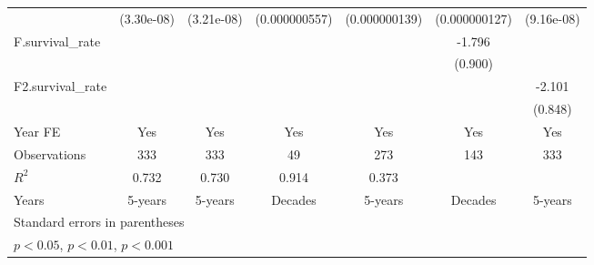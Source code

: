 \begin{table}[htbp]
\begin{tabular}{l*{6}{c}}
                &(3.30e-08)         &(3.21e-08)         &(0.000000557)         &(0.000000139)         &(0.000000127)         &(9.16e-08)         \\
\addlinespace
F.survival\_rate &                  &                  &                  &                  &   -1.796\sym{*}  &                  \\
                &                  &                  &                  &                  &  (0.900)         &                  \\
\addlinespace
F2.survival\_rate&                  &                  &                  &                  &                  &   -2.101\sym{*}  \\
                &                  &                  &                  &                  &                  &  (0.848)         \\
\addlinespace
Year FE         &      Yes         &      Yes         &      Yes         &      Yes         &      Yes         &      Yes         \\
\midrule
Observations    &      333         &      333         &       49         &      273         &      143         &      333         \\
\(R^{2}\)       &    0.732         &    0.730         &    0.914         &    0.373         &                  &                  \\
Years           &  5-years         &  5-years         &  Decades         &  5-years         &  Decades         &  5-years         \\
\bottomrule
\multicolumn{7}{l}{\footnotesize Standard errors in parentheses}\\
\multicolumn{7}{l}{\footnotesize \sym{*} \(p<0.05\), \sym{**} \(p<0.01\), \sym{***} \(p<0.001\)}\\
\end{tabular}
\end{table}
